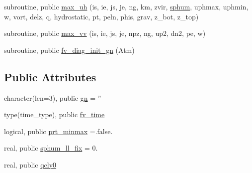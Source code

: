 \begin{DoxyCompactItemize}
\item 
subroutine, public \hyperlink{classfv__diagnostics__mod_ae8c95de79f2b2451535d555342e4e6a0}{max\-\_\-uh} (is, ie, js, je, ng, km, zvir, \hyperlink{classfv__diagnostics__mod_a60dad9285aa4277546ef49434b1d9362}{sphum}, uphmax, uphmin, w, vort, delz, q, hydrostatic, pt, peln, phis, grav, z\-\_\-bot, z\-\_\-top)
\item 
subroutine, public \hyperlink{classfv__diagnostics__mod_a875cdc595d65bd05e1d675003b515eae}{max\-\_\-vv} (is, ie, js, je, npz, ng, up2, dn2, pe, w)
\item 
subroutine, public \hyperlink{classfv__diagnostics__mod_afa241b674a05a46503861a4d26c9ba81}{fv\-\_\-diag\-\_\-init\-\_\-gn} (Atm)
\end{DoxyCompactItemize}
\subsection*{Public Attributes}
\begin{DoxyCompactItemize}
\item 
character(len=3), public \hyperlink{classfv__diagnostics__mod_a6163da8e2b1f43bc8bd4a34782803687}{gn} = ''
\item 
type(time\-\_\-type), public \hyperlink{classfv__diagnostics__mod_ad47b1fcfcd29f3dc6009a3a52208a573}{fv\-\_\-time}
\item 
logical, public \hyperlink{classfv__diagnostics__mod_a8117f5640cc7dedfae666efcc3c9649e}{prt\-\_\-minmax} =.false.
\item 
real, public \hyperlink{classfv__diagnostics__mod_a3ef2fb09ea5556e51585d53e17aeb2ac}{sphum\-\_\-ll\-\_\-fix} = 0.
\item 
real, public \hyperlink{classfv__diagnostics__mod_ab6c6b381b572220bf58a162677af1fe0}{qcly0}
\end{DoxyCompactItemize}
